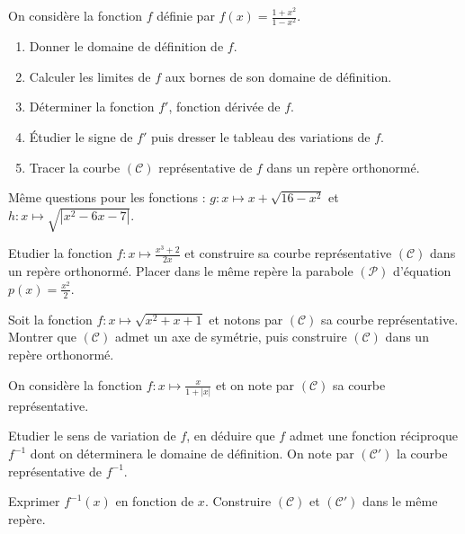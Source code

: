       \begin{exo}
            On consid\`ere la fonction $f$ d\'efinie par $f(x) = \frac{1+x^2}{1-x^2}$.
            \begin{enumerate}
                  \item Donner le domaine de d\'efinition de $f$.
                  \item Calculer les limites de $f$ aux bornes de son domaine de d\'efinition.
                  \item D\'eterminer la fonction $f'$, fonction d\'eriv\'ee de $f$.
                  \item \'Etudier le signe de $f'$ puis dresser le tableau des variations de $f$.
                  \item Tracer la courbe $(\mathscr{C})$ repr\'esentative de $f$ dans un rep\`ere orthonorm\'e.
            \end{enumerate}
            M\^eme questions pour les fonctions : $g:x\mapsto x+\sqrt{16-x^2} $ et $h:x\mapsto\sqrt{|x^2-6x-7|}$.
      \end{exo}
%
      \begin{exo}
            Etudier la fonction $f : x \mapsto \frac{x^3 + 2}{2x}$ et 
            construire sa courbe repr\'esentative $(\mathscr{C})$ dans un rep\`ere orthonorm\'e.
            Placer dans le m\^eme rep\`ere la parabole $(\mathscr{P})$ d'\'equation $p(x) = \frac{x^2}{2}$.
      \end{exo}
%
      \begin{exo}
            Soit la fonction $f : x \mapsto \sqrt{x^2 + x + 1}$ et notons par $(\mathscr{C})$ sa courbe repr\'esentative.
            Montrer que $(\mathscr{C})$ admet un axe de sym\'etrie, puis construire $(\mathscr{C})$ dans un rep\`ere orthonorm\'e.
      \end{exo}
%
      \begin{exo}
            On consid\`ere la fonction $f:x\mapsto \frac{x}{1+|x|}$ et on note par $(\mathscr{C})$ sa courbe repr\'esentative.

            Etudier le sens de variation de $f$, 
            en d\'eduire que $f$ admet une fonction r\'eciproque $f^{-1}$ dont on d\'eterminera le domaine de d\'efinition.
            On note par $(\mathscr{C}')$ la courbe repr\'esentative de $f^{-1}$.
            
            Exprimer $f^{-1} (x)$ en fonction de $x$.
            Construire $(\mathscr{C})$ et $(\mathscr{C}')$ dans le m\^eme rep\`ere.
      \end{exo}
%
